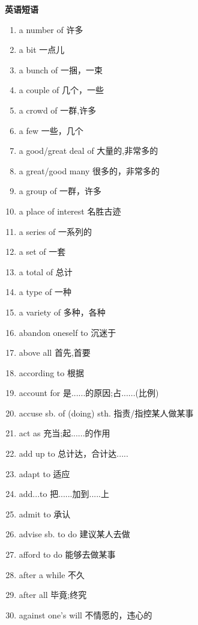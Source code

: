 \documentclass[a4paper,11pt,twocolumn]{ctexart}
\begin{document}

\begin{center}
    \Large\bfseries 英语短语
\end{center}

\begin{enumerate}[label=\arabic*., itemsep=0pt, parsep=2pt, topsep=5pt]
    \item a number of 许多
    \item a bit 一点儿
    \item a bunch of 一捆，一束
    \item a couple of 几个，一些
    \item a crowd of 一群,许多
    \item a few 一些，几个
    \item a good/great deal of 大量的,非常多的
    \item a great/good many 很多的，非常多的
    \item a group of 一群，许多
    \item a place of interest 名胜古迹
    \item a series of 一系列的
    \item a set of 一套
    \item a total of 总计
    \item a type of 一种
    \item a variety of 多种，各种
    \item abandon oneself to 沉迷于
    \item above all 首先,首要
    \item according to 根据
    \item account for 是......的原因;占......(比例)
    \item accuse sb. of (doing) sth. 指责/指控某人做某事
    \item act as 充当;起......的作用
    \item add up to 总计达，合计达.....
    \item adapt to 适应
    \item add...to 把......加到.....上
    \item admit to 承认
    \item advise sb. to do 建议某人去做
    \item afford to do 能够去做某事
    \item after a while 不久
    \item after all 毕竟;终究
    \item against one's will 不情愿的，违心的

\end{enumerate}
\end{document}
